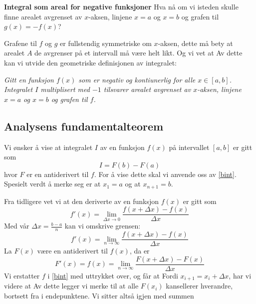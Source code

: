 \textbf{Integral som areal for negative funksjoner}\bs
Hva nå om vi isteden skulle finne arealet avgrenset av $ x $-aksen, linjene $ {x=a} $ og $ {x= b }$ og grafen til $ {g(x) = -f(x)} $? \vsk

Grafene til $ f $ og $ g $ er fullstendig symmetriske om $ x$-aksen, dette må bety at arealet $ A $ de avgrenser på et intervall må være helt likt. Og vi vet at\vs
{}
Av dette kan vi utvide den geometriske definisjonen av integralet:\vsk

 \textsl{Gitt en funksjon $ f(x) $ som er negativ og kontiunerlig for alle $ {x\in[a, b] }$. Integralet $ I $ multiplisert med $ -1 $ tilsvarer arealet avgrenset av $ x $-aksen, linjene $ {x=a} $ og ${ x= b} $ og grafen til $ f $.}
\label{bintslutt}

\subsection*{Analysens fundamentalteorem}
Vi ønsker å vise at integralet $ I $ av en funksjon $ f(x) $ på intervallet $ [a, b] $ er gitt som
\[ I = F(b)-F(a) \]
hvor $ F $ er en antiderivert til $ f $. For å vise dette skal vi anvende oss av \eqref{bint}. Spesielt verdt å merke seg er at $ x_1=a $ og at $ x_{n+1}=b $.\vsk

Fra tidligere vet vi at den deriverte av en funksjon $ f(x) $ er gitt som
\[ f'(x) = \lim\limits_{\Delta x\to 0}\frac{f(x+\Delta x)-f(x)}{\Delta x} \]
Med vår $ \Delta x=\frac{b-a}{n} $ kan vi omskrive grensen:
\[  f'(x)=\lim\limits_{n\to \infty}\frac{f(x+\Delta x)-f(x)}{\Delta x} \]
La $ F(x) $ være en antiderivert til $ f(x) $, da er
\[ F'(x)=f(x)=\lim\limits_{n\to \infty}\frac{F(x+\Delta x)-F(x)}{\Delta x}  \]
Vi erstatter $ f $ i \eqref{bint} med uttrykket over, og får at
Fordi $ {x_{i+1}=x_i+\Delta x} $, har vi videre at
Av dette legger vi merke til at alle $ F(x_i) $ kansellerer hverandre, bortsett fra i endepunktene. Vi sitter altså igjen med summen

